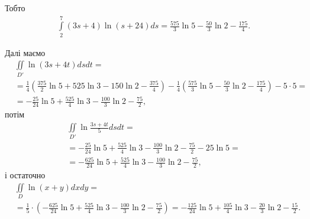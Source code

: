 \begin{example}
Тобто
\begin{align*}
&\int\limits_2^7 \left(3 s + 4\right)\ln\left( s + 24\right) d s = \frac{575}{3}\ln 5 - \frac{50}{3}\ln 2 - \frac{175}{4}.&
\end{align*}

Далі маємо
\begin{align*}
& \iint\limits_{D'}\ln\left(3 s + 4 t\right) d s d t = &\\[6pt]
&= \frac{1}{4}\left(\frac{375}{2}\ln 5 + 525\ln 3 - 150\ln 2 - \frac{375}{4}\right) - \frac{1}{4}\left(\frac{575}{3}\ln 5 - \frac{50}{3}\ln 2 - \frac{175}{4}\right) - 5 \cdot 5 = &\\[6pt]
&=-\frac{25}{24}\ln 5 + \frac{525}{4}\ln 3- \frac{100}{3}\ln 2 - \frac{75}{2},
\end{align*}
потім
\begin{align*}
& \iint\limits_{D'} \ln\frac{3 s + 4 t}{5} d s d t = &\\[6pt]
&=-\frac{25}{24}\ln 5 + \frac{525}{4}\ln 3- \frac{100}{3}\ln 2 - \frac{75}{2} - 25\ln 5 = &\\[6pt]
&=-\frac{625}{24}\ln 5 + \frac{525}{4}\ln 3- \frac{100}{3}\ln 2 - \frac{75}{2},
\end{align*}
і остаточно
\begin{align*}
& \iint\limits_D \ln\left(x + y\right) d x d y = &\\[6pt]
&=\frac{1}{5}\cdot\left(-\frac{625}{24}\ln 5 + \frac{525}{4}\ln 3- \frac{100}{3}\ln 2 - \frac{75}{2}\right) = -\frac{125}{24}\ln 5 + \frac{105}{4}\ln 3- \frac{20}{3}\ln 2 - \frac{15}{2}.
\end{align*}


\end{example}















